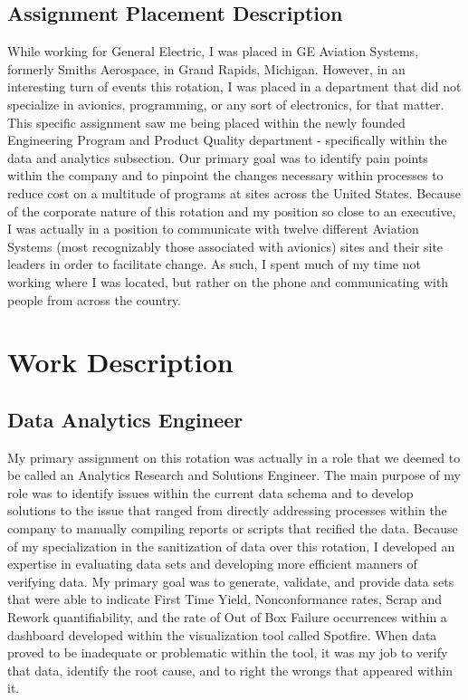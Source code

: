 \documentclass{article}
\begin{document}
\subsection{Assignment Placement Description}
While working for General Electric, I was placed in GE Aviation Systems, formerly Smiths Aerospace, in Grand Rapids, Michigan.
However, in an interesting turn of events this rotation, I was placed in a department that did not specialize in avionics, programming, or any sort of electronics, for that matter.
This specific assignment saw me being placed within the newly founded Engineering Program and Product Quality department - specifically within the data and analytics subsection. Our primary goal was to identify pain points within the company and to pinpoint the changes necessary within processes to reduce cost on a multitude of programs at sites across the United States.
Because of the corporate nature of this rotation and my position so close to an executive, I was actually in a position to communicate with twelve different Aviation Systems (most recognizably those associated with avionics) sites and their site leaders in order to facilitate change. As such, I spent much of my time not working where I was located, but rather on the phone and communicating with people from across the country.

\section{Work Description}
\subsection{Data Analytics Engineer}
My primary assignment on this rotation was actually in a role that we deemed to be called an Analytics Research and Solutions Engineer. The main purpose of my role was to identify issues within the current data schema and to develop solutions to the issue that ranged from directly addressing processes within the company to manually compiling reports or scripts that recified the data.
Because of my specialization in the sanitization of data over this rotation, I developed an expertise in evaluating data sets and developing more efficient manners of verifying data. My primary goal was to generate, validate, and provide data sets that were able to indicate First Time Yield, Nonconformance rates, Scrap and Rework quantifiability, and the rate of Out of Box Failure occurrences within a dashboard developed within the visualization tool called Spotfire. When data proved to be inadequate or problematic within the tool, it was my job to verify that data, identify the root cause, and to right the wrongs that appeared within it.
\end{document}
